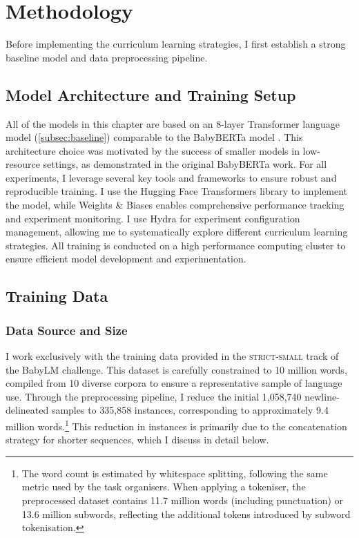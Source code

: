 \section{Methodology}
\label{sec:climb-methodology}

Before implementing the curriculum learning strategies, I first establish a strong baseline model and data preprocessing pipeline. 

\subsection{Model Architecture and Training Setup}
All of the models in this chapter are based on an 8-layer Transformer language model (\cref{subsec:baseline}) comparable to the BabyBERTa model \citep{huebner2021babyberta}. This architecture choice was motivated by the success of smaller models in low-resource settings, as demonstrated in the original BabyBERTa work. For all experiments, I leverage several key tools and frameworks to ensure robust and reproducible training. I use the Hugging Face Transformers library \citep{transformers} to implement the model, while Weights \& Biases \citep{wandb} enables comprehensive performance tracking and experiment monitoring. I use Hydra \citep{hydra} for experiment configuration management, allowing me to systematically explore different curriculum learning strategies. All training is conducted on a high performance computing cluster to ensure efficient model development and experimentation.

\subsection{Training Data}
\label{subsec:data}

\subsubsection{Data Source and Size}
I work exclusively with the training data provided in the \textsc{strict-small} track of the BabyLM challenge. This dataset is carefully constrained to 10 million words, compiled from 10 diverse corpora to ensure a representative sample of language use. Through the preprocessing pipeline, I reduce the initial 1,058,740 newline-delineated samples to 335,858 instances, corresponding to approximately 9.4 million words.\footnote{The word count is estimated by whitespace splitting, following the same metric used by the task organisers. When applying a tokeniser, the preprocessed dataset contains 11.7 million words (including punctuation) or 13.6 million subwords, reflecting the additional tokens introduced by subword tokenisation.} This reduction in instances is primarily due to the concatenation strategy for shorter sequences, which I discuss in detail below.


